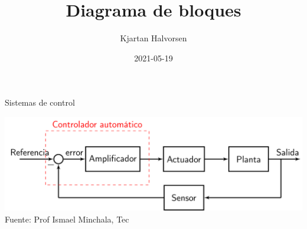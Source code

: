\documentclass[dvisvgm,hypertex,aspectratio=169]{beamer}
\author{Kjartan Halvorsen}
\date{2021-05-19}
\title{Diagrama de bloques}
\begin{document}
\maketitle

\begin{frame}[label=I0]{Sistemas de control}

  \begin{center}
    \includegraphics[width=0.7\linewidth]{minchala-block-control.png}\\
    {\tiny Fuente: Prof Ismael Minchala, Tec}
  \end{center}
\end{frame}


\note{%
}
\end{document}
